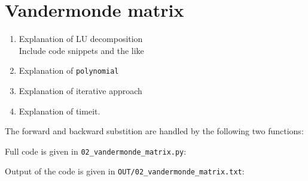 \section{Vandermonde matrix}
\begin{enumerate}[label=(\alph*)]
    \item Explanation of LU decomposition\\
          Include code snippets and the like
    \item Explanation of \texttt{polynomial}
    \item Explanation of iterative approach
    \item Explanation of timeit.
\end{enumerate}

The forward and backward substition are handled by the following two functions:

Full code is given in \texttt{02\_vandermonde\_matrix.py}:


Output of the code is given in \texttt{OUT/02\_vandermonde\_matrix.txt}:


